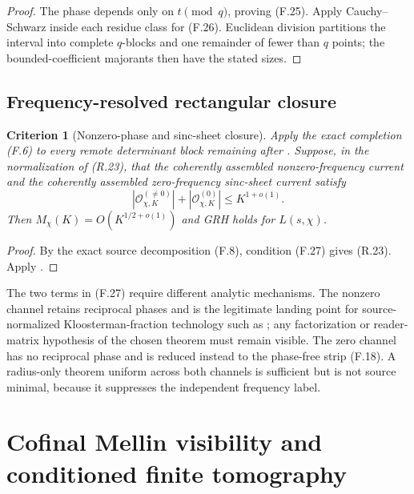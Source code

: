 \documentclass[11pt]{article}
\newtheorem{criterion}[theorem]{Criterion}
\theoremstyle{definition}
\theoremstyle{remark}
\begin{document}
\begin{proof}
The phase depends only on $t\pmod q$, proving \textup{(F.25)}.  Apply
Cauchy--Schwarz inside each residue class for \textup{(F.26)}.  Euclidean
division partitions the interval into complete $q$-blocks and one remainder
of fewer than $q$ points; the bounded-coefficient majorants then have the
stated sizes.
\end{proof}

\subsection{Frequency-resolved rectangular closure}

\begin{criterion}[Nonzero-phase and sinc-sheet closure]
\label{crit:freq-rectangular-closure}
Apply the exact completion \textup{(F.6)} to every remote determinant block
remaining after .  Suppose, in the normalization of
\textup{(R.23)}, that the coherently assembled nonzero-frequency current and
the coherently assembled zero-frequency sinc-sheet current satisfy
\[
 |\mathcal O_{\chi,K}^{(\ne0)}|
 +|\mathcal O_{\chi,K}^{(0)}|
 \le K^{1+o(1)}.
 \tag{F.27}
\]
Then $M_\chi(K)=O(K^{1/2+o(1)})$ and GRH holds for $L(s,\chi)$.
\end{criterion}

\begin{proof}
By the exact source decomposition \textup{(F.8)}, condition
\textup{(F.27)} gives \textup{(R.23)}.  Apply
.
\end{proof}

The two terms in \textup{(F.27)} require different analytic mechanisms.  The
nonzero channel retains reciprocal phases and is the legitimate landing point
for source-normalized Kloosterman-fraction technology such as
\cite{DFI97,BettinChandee}; any factorization or reader-matrix hypothesis of
the chosen theorem must remain visible.  The zero channel has no reciprocal
phase and is reduced instead to the phase-free strip \textup{(F.18)}.  A
radius-only theorem uniform across both channels is sufficient but is not
source minimal, because it suppresses the independent frequency label.

\section{Cofinal Mellin visibility and conditioned finite tomography}
\label{sec:cofinal-mellin}
\end{document}
